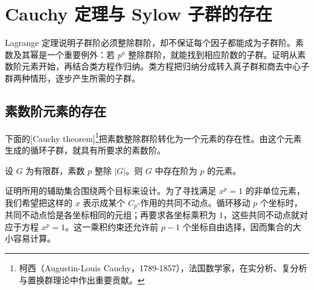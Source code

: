 
\section{Cauchy 定理与 Sylow 子群的存在}
\label{b1:sec:0501}

Lagrange 定理说明子群阶必须整除群阶，却不保证每个因子都能成为子群阶。素数及其幂是一个重要例外：若 \(p^a\) 整除群阶，就能找到相应阶数的子群。证明从素数阶元素开始，再结合类方程作归纳。类方程把归纳分成转入真子群和商去中心子群两种情形，逐步产生所需的子群。


%
%

\subsection{素数阶元素的存在}
\label{b1:subsec:0501:01}

下面的[Cauchy theorem]\footnote{柯西（Augustin-Louis Cauchy，1789-1857），法国数学家，在实分析、复分析与置换群理论中作出重要贡献。}把素数整除群阶转化为一个元素的存在性。由这个元素生成的循环子群，就具有所要求的素数阶。

\begin{theorem}[Cauchy]\label{b1:thm:cauchy}
	设 \(G\) 为有限群，素数 \(p\) 整除 \(|G|\)。则 \(G\) 中存在阶为 \(p\) 的元素。
\end{theorem}

证明所用的辅助集合围绕两个目标来设计。为了寻找满足 \(x^p=1\) 的非单位元素，我们希望把这样的 \(x\) 表示成某个 \(C_p\)-作用的共同不动点。循环移动 \(p\) 个坐标时，共同不动点恰是各坐标相同的元组；再要求各坐标乘积为 \(1\)，这些共同不动点就对应于方程 \(x^p=1\)。这一乘积约束还允许前 \(p-1\) 个坐标自由选择，因而集合的大小容易计算。

